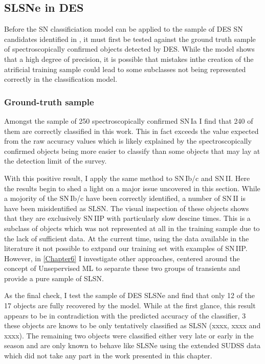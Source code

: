 \begin{figure}
  \caption{}
  \label{sec:SNClassificationROC}
\end{figure}

\subsection{SLSNe in DES}
Before the SN classificiation model can be applied to the sample of DES SN candidates identified in , it must first be tested against the ground truth sample of spectroscopically confirmed objects detected by DES. While the model shows that a high degree of precision, it is possible that mistakes inthe creation of the atrificial training sample could lead to some subclasses not being represented correctly in the classification model.

\subsubsection{Ground-truth sample} \label{sec:SNTruth}
Amongst the sample of 250 spectroscopically confirmed SN\,Ia I find that 240 of them are correctly classified in this work. This in fact exceeds the value expected from the raw accuracy values which is likely explained by the spectroscopically confirmed objects being more easier to classify than some objects that may lay at the detection limit of the survey.

With this positive result, I apply the same method to SN\,Ib/c and SN\,II. Here the results begin to shed a light on a major issue uncovered in this section. While a mojority of the SN\,Ib/c have been correctly identified, a number of SN\,II is have been misidentified as SLSN. The visual inspection of these objects shows that they are exclusively SN\,IIP with particularly slow descine times. This is a subclass of objects which was not represented at all in the training sample due to the lack of sufficient data. At the current time, using the data available in the literature it not possible to extpand our training set with examples of SN\,IIP. However, in \cref{Chapter6} I investigate other approaches, centered around the concept of Unsepervised ML to separate these two groups of transients and provide a pure sample of SLSN.

As the final check, I test the sample of DES SLSNe and find that only 12 of the 17 objects are fully recovered by the model. While at the first glance, this result appears to be in contradiction with the predicted accuracy of the classifier, 3 these objects are knows to be only tentatively classified as SLSN (xxxx, xxxx and xxxx). The remaining two objects were classified either very late or early in the season and are only known to behave like SLSNe using the extended SUDSS data which did not take any part in the work presented in this chapter.

